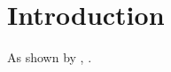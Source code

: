 \section{Introduction}
\label{sec:paper2:intro}
\lipsum[1] As shown by \citet{examplePaper2}, \lipsum[2][1-3] \citep{examplePaper2}.
